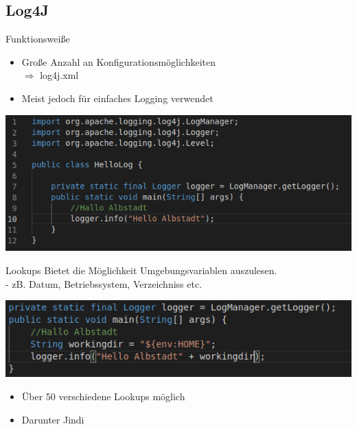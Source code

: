 \documentclass{beamer}
\begin{document}
\subsection{Log4J}
\begin{frame}{Funktionsweiße}
\begin{itemize}
 \item Große Anzahl an Konfigurationsmöglichkeiten\\
$\Rightarrow$ log4j.xml
\item Meist jedoch für einfaches Logging verwendet
\end{itemize}
\begin{center}
\includegraphics[scale=0.45]{log4jexample.png}
\end{center}
\end{frame}
\begin{frame}
 \begin{block}{Lookups}
  Bietet die Möglichkeit Umgebungsvariablen auszulesen.\\
  - zB. Datum, Betriebssystem, Verzeichniss etc.
 \end{block}
 \begin{center}
 \includegraphics[scale=0.45]{lookupsexample.png}
 \end{center}
 \begin{itemize}
  \item  Über 50 verschiedene Lookups möglich
  \item  Darunter Jindi
 \end{itemize}


 \end{frame}
\end{document}
